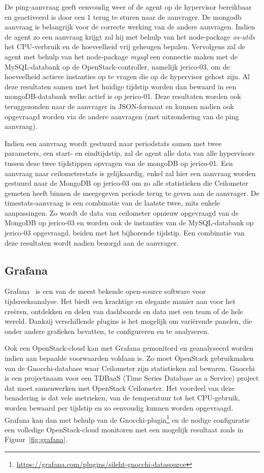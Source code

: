 De ping-aanvraag geeft eenvoudig weer of de agent op de hypervisor bereikbaar en geactiveerd is door een 1 terug te sturen naar de aanvrager. De mongodb aanvraag is belangrijk voor de correcte werking van de andere aanvragen. Indien de agent zo een aanvraag krijgt zal hij met behulp van het node-package \textit{os-utils} het CPU-verbruik en de hoeveelheid vrij geheugen bepalen. Vervolgens zal de agent met behulp van het node-package \textit{mysql} een connectie maken met de MySQL-databank op de OpenStack-controller, namelijk jerico-03, om de hoeveelheid actieve instanties op te vragen die op de hypervisor gehost zijn. Al deze resultaten samen met het huidige tijdstip worden dan bewaard in een mongoDB-databank welke actief is op jerico-01. Deze resultaten worden ook teruggezonden naar de aanvrager in JSON-formaat en kunnen nadien ook opgevraagd worden via de andere aanvragen (met uitzondering van de ping aanvraag).

Indien een aanvraag wordt gestuurd naar periodstats samen met twee parameters, een start- en eindtijdstip, zal de agent alle data van alle hypervisors tussen deze twee tijdstippen opvragen van de mongoDB op jerico-01. Een aanvraag naar ceilometerstats is gelijkaardig, enkel zal hier een aanvraag worden gestuurd naar de MongoDB op jerico-03 om zo alle statistieken die Ceilometer gemeten heeft binnen de meegegeven periode terug te geven aan de aanvrager. De timestats-aanvraag is een combinatie van de laatste twee, mits enkele aanpassingen. Zo wordt de data van ceilometer opnieuw opgevraagd van de MongoDB op jerico-03 en worden ook de instanties van de MySQL-databank op jerico-03 opgevraagd, beiden met het bijhorende tijdstip. Een combinatie van deze resultaten wordt nadien bezorgd aan de aanvrager.

\subsection{Grafana}

Grafana~\cite{Labs} is een van de meest bekende open-source software voor tijdsreeksanalyse. Het biedt een krachtige en elegante manier aan voor het creëren, ontdekken en delen van dashboards en data met een team of de hele wereld. Dankzij verschillende plugins is het mogelijk om variërende panelen, die onder andere grafieken bevatten, te configureren en te analyseren.

Ook een OpenStack-cloud kan met Grafana gemonitord en geanalyseerd worden indien aan bepaalde voorwaarden voldaan is. Zo moet OpenStack gebruikmaken van de Gnocchi-database waar Ceilometer zijn statistieken zal bewaren. Gnocchi~\cite{OpenStack2017d} is een projectnaam voor een TDBaaS (Time Series Database as a Service) project dat moet samenwerken met OpenStack Ceilometer. Het voordeel van deze benadering is dat vele metrieken, van de temperatuur tot het CPU-gebruik, worden bewaard per tijdstip en zo eenvoudig kunnen worden opgevraagd. Grafana kan dan met behulp van de Gnocchi-plugin\footnote{\url{https://grafana.com/plugins/sileht-gnocchi-datasource}} en de nodige configuratie een volledige OpenStack-cloud monitoren met een mogelijk resultaat zoals in Figuur~\ref{fig:grafana}.

